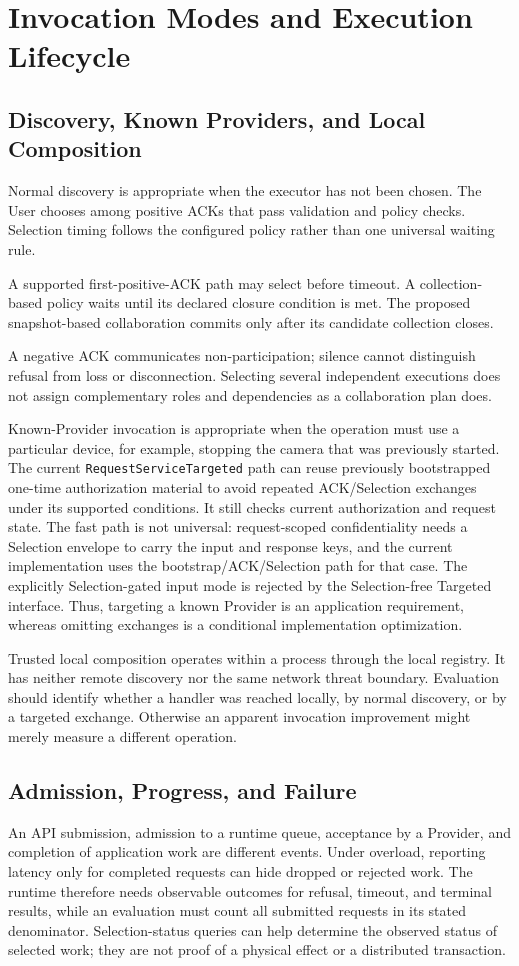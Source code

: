 \section{Invocation Modes and Execution Lifecycle}
\subsection{Discovery, Known Providers, and Local Composition}
Normal discovery is appropriate when the executor has not been chosen. The User chooses among positive ACKs that pass validation and policy checks. Selection timing follows the configured policy rather than one universal waiting rule.

A supported first-positive-ACK path may select before timeout. A collection-based policy waits until its declared closure condition is met. The proposed snapshot-based collaboration commits only after its candidate collection closes.

A negative ACK communicates non-participation; silence cannot distinguish refusal from loss or disconnection. Selecting several independent executions does not assign complementary roles and dependencies as a collaboration plan does.

Known-Provider invocation is appropriate when the operation must use a particular device, for example, stopping the camera that was previously started. The current \texttt{RequestServiceTargeted} path can reuse previously bootstrapped one-time authorization material to avoid repeated ACK/Selection exchanges under its supported conditions. It still checks current authorization and request state. The fast path is not universal: request-scoped confidentiality needs a Selection envelope to carry the input and response keys, and the current implementation uses the bootstrap/ACK/Selection path for that case. The explicitly Selection-gated input mode is rejected by the Selection-free Targeted interface. Thus, targeting a known Provider is an application requirement, whereas omitting exchanges is a conditional implementation optimization.

Trusted local composition operates within a process through the local registry. It has neither remote discovery nor the same network threat boundary. Evaluation should identify whether a handler was reached locally, by normal discovery, or by a targeted exchange. Otherwise an apparent invocation improvement might merely measure a different operation.

\subsection{Admission, Progress, and Failure}
An API submission, admission to a runtime queue, acceptance by a Provider, and completion of application work are different events. Under overload, reporting latency only for completed requests can hide dropped or rejected work. The runtime therefore needs observable outcomes for refusal, timeout, and terminal results, while an evaluation must count all submitted requests in its stated denominator. Selection-status queries can help determine the observed status of selected work; they are not proof of a physical effect or a distributed transaction.

